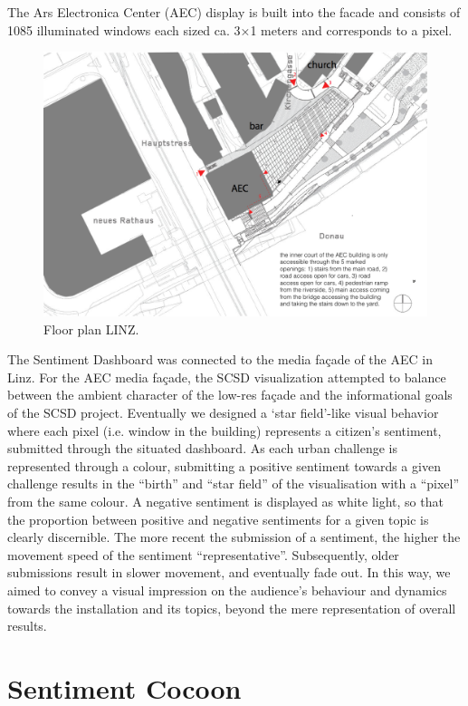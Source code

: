 The Ars Electronica Center (AEC) display is built into the facade and consists of 1085 illuminated windows each sized ca. 3×1 meters and corresponds to a pixel.
\begin{figure}[!h] 
\centering
\includegraphics[width=\textwidth]{Illustrations/AEC_floorplan.png}
\caption [Floor plan LINZ] {Floor plan LINZ.}
\label{LINZfloorplan}
\end{figure}
The Sentiment Dashboard was connected to the media façade of the AEC in Linz. 
For the AEC media façade, the SCSD visualization attempted to balance between the ambient character of the low-res façade and the informational goals of the SCSD project. Eventually we designed a ‘star field’-like visual behavior where each pixel (i.e. window in the building) represents a citizen’s sentiment, submitted through the situated dashboard. As each urban challenge is represented through a colour, submitting a positive sentiment towards a given challenge results in the “birth” and “star field” of the visualisation with a “pixel” from the same colour. A negative sentiment is displayed as white light, so that the proportion between positive and negative sentiments for a given topic is clearly discernible. The more recent the submission of a sentiment, the higher the movement speed of the sentiment “representative”. Subsequently, older submissions result in slower movement, and eventually fade out. In this way, we aimed to convey a visual impression on the audience’s behaviour and dynamics towards the installation and its topics, beyond the mere representation of overall results.

\section{Sentiment Cocoon}

